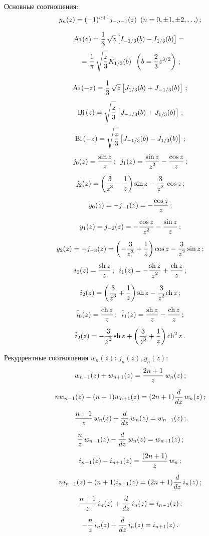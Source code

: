 \begin{multicols}{2}
{{Основные соотношения:}
    $$
    y_n(z) = (-1)^{n+1} j_{-n-1} (z) \enskip (n=0, \pm 1, \pm 2,\ldots)\,;
    $$
    
\vspace*{-10pt}

\noindent
\begin{multline*}
    \Ai (z) = \fr{1}{3}\, \sqrt{z} \lk I_{-1/3} (b) - 
    I_{1/3}(b)\rk ={}\\
    {}= \fr{1}{\pi}\, \sqrt{\fr{z}{3}} K_{1/3} (b)\enskip 
    \left( b= \fr{2}{3} z^{3/2}\right)\,;
    \end{multline*}
    
    \noindent
    $$
    \Ai (-z) = \fr{1}{3}\, \sqrt{z} \lk J_{1/3} (b) + J_{-1/3}(b)\rk\,;
    $$
  $$
  \Bi (z) =  \sqrt{\fr{z}{3}} \lk J_{-1/3} (b) + J_{1/3}(b)\rk\,;
  $$
  $$
  \Bi (-z) =  \sqrt{\fr{z}{3}} \lk J_{-1/3} (b) - J_{1/3}(b)\rk\,;
  $$
    $$
    j_0(z) = \fr{\sin z}{z}\,;\enskip 
    j_1(z) = \fr{\sin z}{z^2}- \fr{\cos z}{z}\,;
    $$
    $$
    j_2(z) = \left(\fr{3}{z^3}-\fr{1}{z}\right) \sin z - \fr{3}{z^2}\, \cos z\,;
    $$
  $$
  y_0(z) = -j_{-1} (z) = -\fr{\cos z}{z}\,;
  $$
  $$ 
  y_1 (z) = j_{-2}(z) = - \fr{\cos z}{z^2} - \fr{\sin z}{z}\,;
  $$
  $$
  y_2(z) =-j_{-3}(z)= \left(-\fr{3}{z^3}+\fr{1}{z}\right) \cos z - 
  \fr{3}{z^2} \sin z\,;
  $$
    $$
    i_0 (z) = \fr{\mathrm{sh}\, z}{z}\,; \enskip 
    i_1 (z) = -\fr{\mathrm{sh}\, z}{z^2}+ \fr{\mathrm{ch}\, z}{z}\,;
    $$
    $$
    i_2 (z) = \left(\fr{3}{z^3} + \fr{1}{z}\right)\mathrm{sh}\, z - 
    \fr{3}{z^2}{\mathrm{ch}}\, z\,;
    $$
    $$
    \tilde i_0 (z) = \fr{\mathrm{ch}\, z}{z}\,;\enskip 
    \tilde i_1(z) = \fr{\mathrm{sh}\, z}{z} -\fr{\mathrm{ch}\, z}{z}\,;
    $$
    $$
    \tilde  i_2 (z) = -\fr{3}{z^2} \,\mathrm{sh}\, z + \left(
    \fr{3}{z^3} + \fr{1}{z}\right) \mathrm{ch}^2\, z\,.
    $$

Рекуррентные соотношения $w_n(z):\, j_n (z), y_n (z)$:
    $$
    w_{n-1} (z) + w_{n+1} (z)= \fr{2n+1}{z}\, w_n (z)\,;
    $$
    $$
    nw_{n-1} (z) -(n+1) w_{n+1} (z)= (2n+1)\fr{d}{dz}\, w_n (z)\,;
    $$
    $$
    \fr{n+1}{z}\, w_n (z) + \fr{d}{dz}\, w_n (z) = w_{n-1}(z)\,;
    $$
     $$
     \fr{n}{z}\, w_{n-1} (z) -\fr{d}{dz}\, w_n (z) = w_{n+1} (z)\,;
     $$
     $$
     i_{n-1} (z) - i_{n+1} (z) = \fr{(2n+1)}{z}\, w_n\,;
     $$
     $$
     n i_{n-1}(z) + (n+1) i_{n+1} (z) = (2n +1) \fr{d}{dz}\, i_n (z)\,;
     $$
    $$
    \fr{n+1}{z}\, i_n (z) +\fr{d}{dz}\,i_n(z) = i_{n-1} (z)\,;
     $$
    $$
    -\fr{n}{z}\, i_n(z) +\fr{d}{dz}\, i_n(z) = i_{n+1}(z)\,.
    $$

}
\end{multicols}
